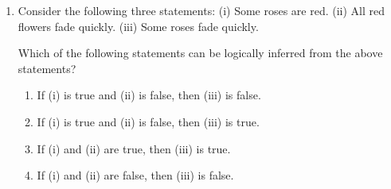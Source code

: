 \documentclass[a4paper,10pt]{article}
\begin{document}
\begin{enumerate}
    \item Consider the following three statements:
    (i) Some roses are red.
    (ii) All red flowers fade quickly.
    (iii) Some roses fade quickly.
    
    Which of the following statements can be logically inferred from the above statements?
    \hfill{}
    \begin{enumerate}[label=\Alph*)]
        \item If (i) is true and (ii) is false, then (iii) is false.
        \item If (i) is true and (ii) is false, then (iii) is true.
        \item If (i) and (ii) are true, then (iii) is true.
        \item If (i) and (ii) are false, then (iii) is false.
    \end{enumerate}
\end{enumerate}
\clearpage
\end{document}

